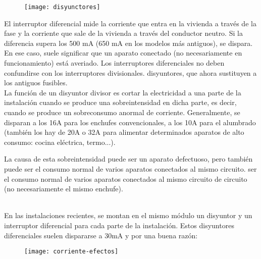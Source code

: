 \begin{figure}[h]
\texttt{[image: disyunctores]} 
\centering
\end{figure}

El interruptor diferencial mide la corriente que entra en la vivienda a través de la fase y la corriente que sale de la vivienda a través del conductor neutro.
Si la diferencia supera los 500 mA (650 mA en los modelos más antiguos), se dispara.
En ese caso, suele significar que un aparato conectado (no necesariamente en funcionamiento) está averiado.
Los interruptores diferenciales no deben confundirse con los interruptores divisionales.
disyuntores, que ahora sustituyen a los antiguos fusibles.\\

La función de un disyuntor divisor es cortar la electricidad a una parte de la instalación cuando se produce una sobreintensidad en dicha parte, es decir, cuando se produce un sobreconsumo anormal de corriente.
Generalmente, se disparan a los 16A para los enchufes convencionales, a los 10A
para el alumbrado (también los hay de 20A o 32A para alimentar determinados aparatos de alto consumo: cocina eléctrica, termo...).

La causa de esta sobreintensidad puede ser un aparato defectuoso, pero también puede ser el consumo normal de varios aparatos conectados al mismo circuito.
ser el consumo normal de varios aparatos conectados al mismo circuito de
circuito (no necesariamente el mismo enchufe).

\noindent{}\\

En las instalaciones recientes, se montan en el mismo módulo un disyuntor y un interruptor diferencial para cada parte de la instalación. Estos disyuntores diferenciales suelen dispararse a 30mA y por una buena razón:

\begin{figure}[h]
\texttt{[image: corriente-efectos]} 
\centering
\end{figure}

